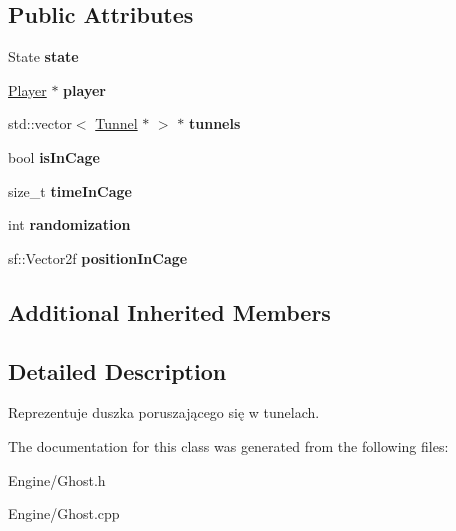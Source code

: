 \subsection*{Public Attributes}
\begin{DoxyCompactItemize}
\item 
\mbox{\label{classGhost_a6b7e1f6e9e5ef6767d4b80429088c00a}} 
State {\bfseries state}
\item 
\mbox{\label{classGhost_ab4919b308d77f53f5ca29077633ccb8f}} 
\hyperlink{classPlayer}{Player} $\ast$ {\bfseries player}
\item 
\mbox{\label{classGhost_a312091529dd2c63266aa9acf7bc968c8}} 
std\+::vector$<$ \hyperlink{classTunnel}{Tunnel} $\ast$ $>$ $\ast$ {\bfseries tunnels}
\item 
\mbox{\label{classGhost_aa63992f9728d0daa362c6e74884f51ec}} 
bool {\bfseries is\+In\+Cage}
\item 
\mbox{\label{classGhost_aaa355fe13f96b7665d3218ba82008248}} 
size\+\_\+t {\bfseries time\+In\+Cage}
\item 
\mbox{\label{classGhost_aca51db20e7a8357ab1d36bfc58873a71}} 
int {\bfseries randomization}
\item 
\mbox{\label{classGhost_a4ab03d6825c037262095c320df35fc6b}} 
sf\+::\+Vector2f {\bfseries position\+In\+Cage}
\end{DoxyCompactItemize}
\subsection*{Additional Inherited Members}


\subsection{Detailed Description}
Reprezentuje duszka poruszającego się w tunelach. 

The documentation for this class was generated from the following files\+:\begin{DoxyCompactItemize}
\item 
Engine/Ghost.\+h\item 
Engine/Ghost.\+cpp\end{DoxyCompactItemize}

